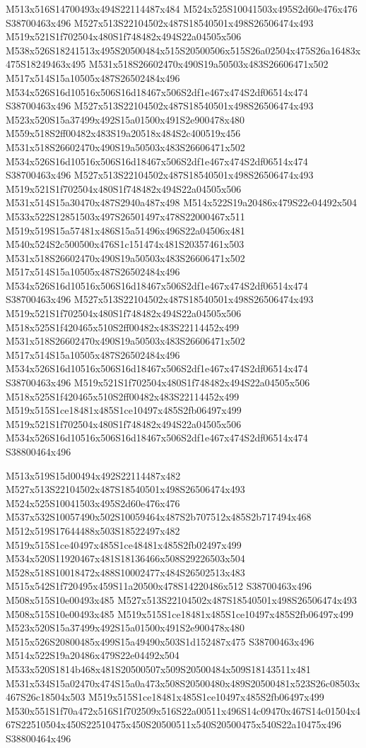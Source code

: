 \documentclass{article}
\begin{document}
\begin{multicols}{2}
M513x516S14700493x494S22114487x484 M524x525S10041503x495S2d60e476x476 S38700463x496 M527x513S22104502x487S18540501x498S26506474x493 M519x521S1f702504x480S1f748482x494S22a04505x506 M538x526S18241513x495S20500484x515S20500506x515S26a02504x475S26a16483x475S18249463x495 M531x518S26602470x490S19a50503x483S26606471x502 M517x514S15a10505x487S26502484x496 M534x526S16d10516x506S16d18467x506S2df1e467x474S2df06514x474 S38700463x496 M527x513S22104502x487S18540501x498S26506474x493 M523x520S15a37499x492S15a01500x491S2e900478x480 M559x518S2ff00482x483S19a20518x484S2c400519x456 M531x518S26602470x490S19a50503x483S26606471x502 M534x526S16d10516x506S16d18467x506S2df1e467x474S2df06514x474 S38700463x496 M527x513S22104502x487S18540501x498S26506474x493 M519x521S1f702504x480S1f748482x494S22a04505x506 M531x514S15a30470x487S2940a487x498 M514x522S19a20486x479S22e04492x504 M533x522S12851503x497S26501497x478S22000467x511 M519x519S15a57481x486S15a51496x496S22a04506x481 M540x524S2c500500x476S1c151474x481S20357461x503 M531x518S26602470x490S19a50503x483S26606471x502 M517x514S15a10505x487S26502484x496 M534x526S16d10516x506S16d18467x506S2df1e467x474S2df06514x474 S38700463x496 M527x513S22104502x487S18540501x498S26506474x493 M519x521S1f702504x480S1f748482x494S22a04505x506 M518x525S1f420465x510S2ff00482x483S22114452x499 M531x518S26602470x490S19a50503x483S26606471x502 M517x514S15a10505x487S26502484x496 M534x526S16d10516x506S16d18467x506S2df1e467x474S2df06514x474 S38700463x496 M519x521S1f702504x480S1f748482x494S22a04505x506 M518x525S1f420465x510S2ff00482x483S22114452x499 M519x515S1ce18481x485S1ce10497x485S2fb06497x499 M519x521S1f702504x480S1f748482x494S22a04505x506 M534x526S16d10516x506S16d18467x506S2df1e467x474S2df06514x474 S38800464x496

M513x519S15d00494x492S22114487x482 M527x513S22104502x487S18540501x498S26506474x493 M524x525S10041503x495S2d60e476x476 M537x532S10057490x502S10059464x487S2b707512x485S2b717494x468 M512x519S17644488x503S18522497x482 M519x515S1ce40497x485S1ce48481x485S2fb02497x499 M534x520S11920467x481S18136466x508S29226503x504 M528x518S10018472x488S10002477x484S26502513x483 M515x542S1f720495x459S11a20500x478S14220486x512 S38700463x496 M508x515S10e00493x485 M527x513S22104502x487S18540501x498S26506474x493 M508x515S10e00493x485 M519x515S1ce18481x485S1ce10497x485S2fb06497x499 M523x520S15a37499x492S15a01500x491S2e900478x480 M515x526S20800485x499S15a49490x503S1d152487x475 S38700463x496 M514x522S19a20486x479S22e04492x504 M533x520S1814b468x481S20500507x509S20500484x509S18143511x481 M531x534S15a02470x474S15a0a473x508S20500480x489S20500481x523S26c08503x467S26c18504x503 M519x515S1ce18481x485S1ce10497x485S2fb06497x499 M530x551S1f70a472x516S1f702509x516S22a00511x496S14c09470x467S14c01504x467S22510504x450S22510475x450S20500511x540S20500475x540S22a10475x496 S38800464x496


\end{multicols}
\end{document}
